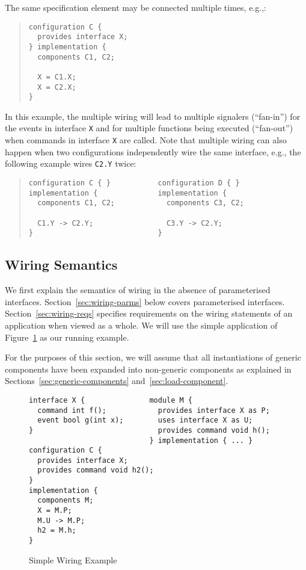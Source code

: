 \documentclass[11pt,letterpaper]{article}
\newcommand{\code}[1]{{\tt #1}}
\begin{document}
The same specification element may be connected multiple times, e.g.,:
\begin{quote} \begin{verbatim}
configuration C {
  provides interface X;
} implementation {
  components C1, C2;

  X = C1.X;
  X = C2.X;
}
\end{verbatim} \end{quote}
In this example, the multiple wiring will lead to multiple signalers
(``fan-in'') for the events in interface \code{X} and for multiple
functions being executed (``fan-out'') when commands in interface \code{X}
are called. Note that multiple wiring can also happen when two
configurations independently wire the same interface, e.g., the
following example wires \code{C2.Y} twice:
\begin{quote} \begin{verbatim}
configuration C { }           configuration D { }
implementation {              implementation {
  components C1, C2;            components C3, C2;

  C1.Y -> C2.Y;                 C3.Y -> C2.Y;
}                             }
\end{verbatim} \end{quote}

\subsection{Wiring Semantics}
\label{sec:wiring-semantics}

We first explain the semantics of wiring in the absence of parameterised
interfaces. Section~\ref{sec:wiring-parms} below covers parameterised
interfaces. Section~\ref{sec:wiring-reqs} specifies requirements
on the wiring statements of an application when viewed as a whole. We will
use the simple application of Figure~\ref{fig:wiring} as our running
example.

For the purposes of this section, we will assume that all instantiations of
generic components have been expanded into non-generic components as
explained in Sections~\ref{sec:generic-components}
and~\ref{sec:load-component}.

\begin{figure}
\begin{verbatim}
interface X {               module M {
  command int f();            provides interface X as P;
  event bool g(int x);        uses interface X as U;
}                             provides command void h();
                            } implementation { ... }
configuration C {
  provides interface X;
  provides command void h2();
}
implementation {
  components M;
  X = M.P;
  M.U -> M.P;
  h2 = M.h;
}  
\end{verbatim}
\caption{Simple Wiring Example}
\label{fig:wiring}
\end{figure}
\end{document}
